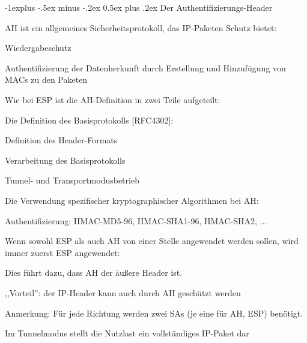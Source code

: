 \documentclass[a4paper]{article}
\makeatletter
\renewcommand{\subsection}{\@startsection{subsection}{2}{0mm}%
 {-1explus -.5ex minus -.2ex}%
 {0.5ex plus .2ex}%
 {\normalfont\normalsize\bfseries}}
\makeatother
\begin{document}
\begin{multicols}{3}
      \subsection{Der Authentifizierungs-Header}
      \begin{itemize*}
            \item AH ist ein allgemeines Sicherheitsprotokoll, das IP-Paketen Schutz bietet:
            \begin{itemize*}
                  \item Wiedergabeschutz
                  \item Authentifizierung der Datenherkunft durch Erstellung und Hinzufügung von MACs zu den Paketen
            \end{itemize*}
            \item Wie bei ESP ist die AH-Definition in zwei Teile aufgeteilt:
            \begin{itemize*}
                  \item Die Definition des Basisprotokolls {[}RFC4302{]}:
                  \begin{itemize*}
                        \item Definition des Header-Formats
                        \item Verarbeitung des Basisprotokolls
                        \item Tunnel- und Transportmodusbetrieb
                  \end{itemize*}
                  \item Die Verwendung spezifischer kryptographischer Algorithmen bei AH:
                  \begin{itemize*}
                        \item Authentifizierung: HMAC-MD5-96, HMAC-SHA1-96, HMAC-SHA2, ...
                        \item Wenn sowohl ESP als auch AH von einer Stelle angewendet werden sollen, wird immer zuerst ESP angewendet:
                  \end{itemize*}
                  \item Dies führt dazu, dass AH der äußere Header ist.
                  \item ,,Vorteil'': der IP-Header kann auch durch AH geschützt werden
                  \item Anmerkung: Für jede Richtung werden zwei SAs (je eine für AH, ESP) benötigt.
            \end{itemize*}
            \item Im Tunnelmodus stellt die Nutzlast ein vollständiges IP-Paket dar

\end{itemize*}
\end{multicols}
\end{document}
